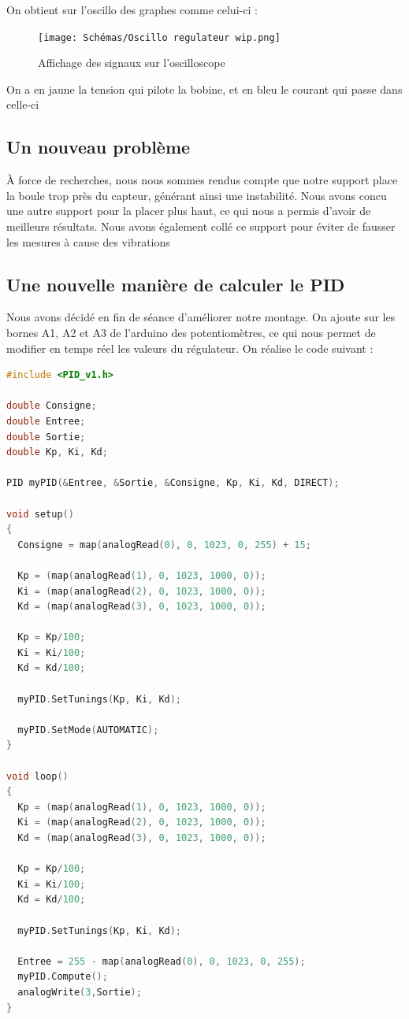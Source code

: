 \documentclass[11pt,a4paper]{article}
\begin{document}
On obtient sur l'oscillo des graphes comme celui-ci :
\begin{figure} [H]
\begin{center}
\texttt{[image: Schémas/Oscillo regulateur wip.png]} 
\end{center}
\caption{Affichage des signaux sur l'oscilloscope}
\end{figure}
On a en jaune la tension qui pilote la bobine, et en bleu le courant qui passe dans celle-ci

\subsection{Un nouveau problème}
À force de recherches, nous nous sommes rendus compte que notre support place la boule trop près du capteur, générant ainsi une instabilité. Nous avons concu une autre support pour la placer plus haut, ce qui nous a permis d'avoir de meilleurs résultats. Nous avons également collé ce support pour éviter de fausser les mesures à cause des vibrations

\subsection{Une nouvelle manière de calculer le PID}
Nous avons décidé en fin de séance d'améliorer notre montage. On ajoute sur les bornes A1, A2 et A3 de l'arduino des potentiomètres, ce qui nous permet de modifier en temps réel les valeurs du régulateur. On réalise le code suivant :
\begin{lstlisting}[language = C]
#include <PID_v1.h>

double Consigne;
double Entree;
double Sortie;
double Kp, Ki, Kd;

PID myPID(&Entree, &Sortie, &Consigne, Kp, Ki, Kd, DIRECT);

void setup()
{
  Consigne = map(analogRead(0), 0, 1023, 0, 255) + 15;

  Kp = (map(analogRead(1), 0, 1023, 1000, 0));
  Ki = (map(analogRead(2), 0, 1023, 1000, 0));
  Kd = (map(analogRead(3), 0, 1023, 1000, 0));

  Kp = Kp/100;
  Ki = Ki/100;
  Kd = Kd/100;

  myPID.SetTunings(Kp, Ki, Kd);  

  myPID.SetMode(AUTOMATIC);
}

void loop()
{
  Kp = (map(analogRead(1), 0, 1023, 1000, 0));
  Ki = (map(analogRead(2), 0, 1023, 1000, 0));
  Kd = (map(analogRead(3), 0, 1023, 1000, 0));

  Kp = Kp/100;
  Ki = Ki/100;
  Kd = Kd/100;

  myPID.SetTunings(Kp, Ki, Kd);  

  Entree = 255 - map(analogRead(0), 0, 1023, 0, 255);
  myPID.Compute();
  analogWrite(3,Sortie);
}
\end{lstlisting}
\end{document}
